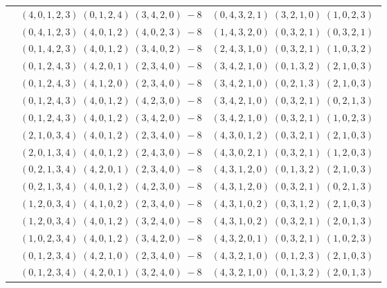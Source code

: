 \documentclass[11pt]{article}
\begin{document}
\begin{longtable}[l]{|c|c|c|}
 \cline{2-3} 
 & $(4 ,0 ,1 ,2 ,3) \;(0 ,1 ,2 ,4) \;(3 ,4 ,2 ,0) \;-8$ & $(0 ,4 ,3 ,2 ,1) \;(3 ,2 ,1 ,0) \;(1 ,0 ,2 ,3) \;$\\ 
 \cline{2-3} 
 & $(0 ,4 ,1 ,2 ,3) \;(4 ,0 ,1 ,2) \;(4 ,0 ,2 ,3) \;-8$ & $(1 ,4 ,3 ,2 ,0) \;(0 ,3 ,2 ,1) \;(0 ,3 ,2 ,1) \;$\\ 
 \cline{2-3} 
 & $(0 ,1 ,4 ,2 ,3) \;(4 ,0 ,1 ,2) \;(3 ,4 ,0 ,2) \;-8$ & $(2 ,4 ,3 ,1 ,0) \;(0 ,3 ,2 ,1) \;(1 ,0 ,3 ,2) \;$\\ 
 \cline{2-3} 
 & $(0 ,1 ,2 ,4 ,3) \;(4 ,2 ,0 ,1) \;(2 ,3 ,4 ,0) \;-8$ & $(3 ,4 ,2 ,1 ,0) \;(0 ,1 ,3 ,2) \;(2 ,1 ,0 ,3) \;$\\ 
 \cline{2-3} 
 & $(0 ,1 ,2 ,4 ,3) \;(4 ,1 ,2 ,0) \;(2 ,3 ,4 ,0) \;-8$ & $(3 ,4 ,2 ,1 ,0) \;(0 ,2 ,1 ,3) \;(2 ,1 ,0 ,3) \;$\\ 
 \cline{2-3} 
 & $(0 ,1 ,2 ,4 ,3) \;(4 ,0 ,1 ,2) \;(4 ,2 ,3 ,0) \;-8$ & $(3 ,4 ,2 ,1 ,0) \;(0 ,3 ,2 ,1) \;(0 ,2 ,1 ,3) \;$\\ 
 \cline{2-3} 
 & $(0 ,1 ,2 ,4 ,3) \;(4 ,0 ,1 ,2) \;(3 ,4 ,2 ,0) \;-8$ & $(3 ,4 ,2 ,1 ,0) \;(0 ,3 ,2 ,1) \;(1 ,0 ,2 ,3) \;$\\ 
 \cline{2-3} 
 & $(2 ,1 ,0 ,3 ,4) \;(4 ,0 ,1 ,2) \;(2 ,3 ,4 ,0) \;-8$ & $(4 ,3 ,0 ,1 ,2) \;(0 ,3 ,2 ,1) \;(2 ,1 ,0 ,3) \;$\\ 
 \cline{2-3} 
 & $(2 ,0 ,1 ,3 ,4) \;(4 ,0 ,1 ,2) \;(2 ,4 ,3 ,0) \;-8$ & $(4 ,3 ,0 ,2 ,1) \;(0 ,3 ,2 ,1) \;(1 ,2 ,0 ,3) \;$\\ 
 \cline{2-3} 
 & $(0 ,2 ,1 ,3 ,4) \;(4 ,2 ,0 ,1) \;(2 ,3 ,4 ,0) \;-8$ & $(4 ,3 ,1 ,2 ,0) \;(0 ,1 ,3 ,2) \;(2 ,1 ,0 ,3) \;$\\ 
 \cline{2-3} 
 & $(0 ,2 ,1 ,3 ,4) \;(4 ,0 ,1 ,2) \;(4 ,2 ,3 ,0) \;-8$ & $(4 ,3 ,1 ,2 ,0) \;(0 ,3 ,2 ,1) \;(0 ,2 ,1 ,3) \;$\\ 
 \cline{2-3} 
 & $(1 ,2 ,0 ,3 ,4) \;(4 ,1 ,0 ,2) \;(2 ,3 ,4 ,0) \;-8$ & $(4 ,3 ,1 ,0 ,2) \;(0 ,3 ,1 ,2) \;(2 ,1 ,0 ,3) \;$\\ 
 \cline{2-3} 
 & $(1 ,2 ,0 ,3 ,4) \;(4 ,0 ,1 ,2) \;(3 ,2 ,4 ,0) \;-8$ & $(4 ,3 ,1 ,0 ,2) \;(0 ,3 ,2 ,1) \;(2 ,0 ,1 ,3) \;$\\ 
 \cline{2-3} 
 & $(1 ,0 ,2 ,3 ,4) \;(4 ,0 ,1 ,2) \;(3 ,4 ,2 ,0) \;-8$ & $(4 ,3 ,2 ,0 ,1) \;(0 ,3 ,2 ,1) \;(1 ,0 ,2 ,3) \;$\\ 
 \cline{2-3} 
 & $(0 ,1 ,2 ,3 ,4) \;(4 ,2 ,1 ,0) \;(2 ,3 ,4 ,0) \;-8$ & $(4 ,3 ,2 ,1 ,0) \;(0 ,1 ,2 ,3) \;(2 ,1 ,0 ,3) \;$\\ 
 \cline{2-3} 
 & $(0 ,1 ,2 ,3 ,4) \;(4 ,2 ,0 ,1) \;(3 ,2 ,4 ,0) \;-8$ & $(4 ,3 ,2 ,1 ,0) \;(0 ,1 ,3 ,2) \;(2 ,0 ,1 ,3) \;$\\ 

\end{longtable}
\end{document}
